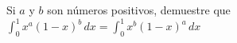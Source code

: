 \item Si $a$ y $b$ son números positivos, demuestre que $\displaystyle \int_0^1 x^a(1 - x)^b \, dx = \int_0^1 x^b(1 - x)^a \, dx$

